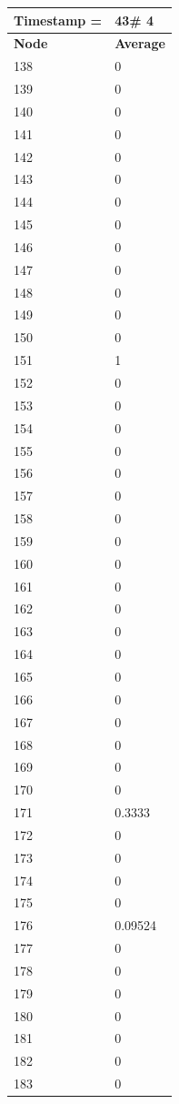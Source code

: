 \begin{tabular}{|l||l|}
\hline
\textbf{Timestamp =} & \textbf{43}\# 4\\\hline
	\textbf{Node} & \textbf{Average} \\ \hline
\hline
	138 & 0 \\ \hline
	139 & 0 \\ \hline
	140 & 0 \\ \hline
	141 & 0 \\ \hline
	142 & 0 \\ \hline
	143 & 0 \\ \hline
	144 & 0 \\ \hline
	145 & 0 \\ \hline
	146 & 0 \\ \hline
	147 & 0 \\ \hline
	148 & 0 \\ \hline
	149 & 0 \\ \hline
	150 & 0 \\ \hline
	151 & 1 \\ \hline
	152 & 0 \\ \hline
	153 & 0 \\ \hline
	154 & 0 \\ \hline
	155 & 0 \\ \hline
	156 & 0 \\ \hline
	157 & 0 \\ \hline
	158 & 0 \\ \hline
	159 & 0 \\ \hline
	160 & 0 \\ \hline
	161 & 0 \\ \hline
	162 & 0 \\ \hline
	163 & 0 \\ \hline
	164 & 0 \\ \hline
	165 & 0 \\ \hline
	166 & 0 \\ \hline
	167 & 0 \\ \hline
	168 & 0 \\ \hline
	169 & 0 \\ \hline
	170 & 0 \\ \hline
	171 & 0.3333 \\ \hline
	172 & 0 \\ \hline
	173 & 0 \\ \hline
	174 & 0 \\ \hline
	175 & 0 \\ \hline
	176 & 0.09524 \\ \hline
	177 & 0 \\ \hline
	178 & 0 \\ \hline
	179 & 0 \\ \hline
	180 & 0 \\ \hline
	181 & 0 \\ \hline
	182 & 0 \\ \hline
	183 & 0 \\ \hline
\end{tabular}
